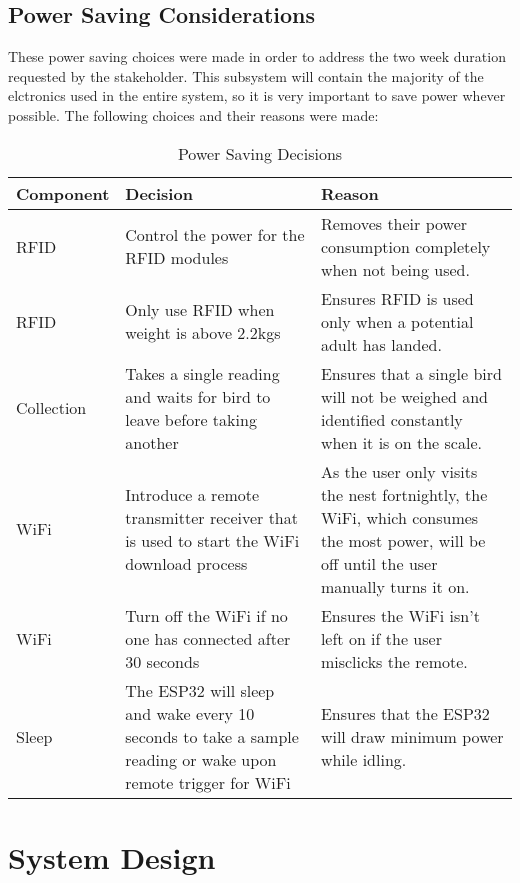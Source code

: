 \documentclass[class=report,11pt,crop=false]{standalone}
\begin{document}
\subsection*{Power Saving Considerations}

These power saving choices were made in order to address the two week duration requested by the stakeholder. This subsystem will contain the majority of the elctronics used in the entire system, so it is very important to save power whever possible. The following choices and their reasons were made:

\begin{table}[htbp]
    \centering
    {\begin{tabular}{|l|p{0.5\linewidth}|p{0.5\linewidth}|}
        \hline
        \textbf{Component} & \textbf{Decision} & \textbf{Reason} \\
        \hline
        RFID & Control the power for the RFID modules & Removes their power consumption completely when not being used. \\
        \hline
        RFID & Only use RFID when weight is above 2.2kgs & Ensures RFID is used only when a potential adult has landed. \\
        \hline
        Collection & Takes a single reading and waits for bird to leave before taking another & Ensures that a single bird will not be weighed and identified constantly when it is on the scale. \\
        \hline
        WiFi & Introduce a remote transmitter receiver that is used to start the WiFi download process & As the user only visits the nest fortnightly, the WiFi, which consumes the most power, will be off until the user manually turns it on. \\
        \hline
        WiFi & Turn off the WiFi if no one has connected after 30 seconds & Ensures the WiFi isn't left on if the user misclicks the remote. \\
        \hline
        Sleep & The ESP32 will sleep and wake every 10 seconds to take a sample reading or wake upon remote trigger for WiFi & Ensures that the ESP32 will draw minimum power while idling. \\
        \hline
    \end{tabular}}
    \label{tab:component_decisions}
    \caption{Power Saving Decisions}
\end{table}

\section{System Design}
\end{document}

